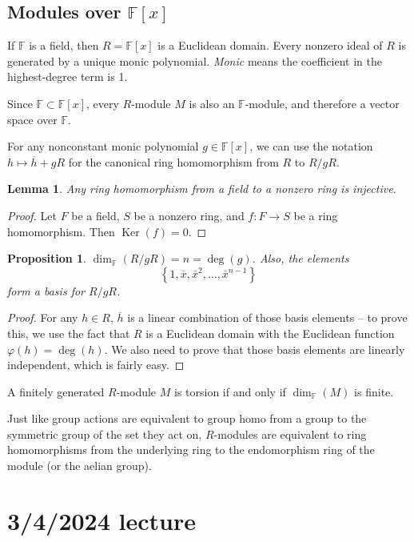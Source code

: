 \documentclass[12pt]{article}
\newtheorem{lem}[thm]{Lemma}
\newtheorem{prop}[thm]{Proposition}
\begin{document}
\subsection{Modules over $\mathbb{F}[x]$}
If $\mathbb{F}$ is a field, then $R=\mathbb{F}[x]$ is a Euclidean domain. Every nonzero ideal of $R$ is generated by a unique monic polynomial. \textit{Monic} means the coefficient in the highest-degree term is 1.
\par
Since $\mathbb{F} \subset \mathbb{F}[x]$, every $R$-module $M$ is also an $\mathbb{F}$-module, and therefore a vector space over $\mathbb{F}$.
\par
For any nonconstant monic polynomial $g \in \mathbb{F}[x]$, we can use the notation $h \mapsto \overline{h}+gR$ for the canonical ring homomorphism from $R$ to $R/gR$.
\begin{lem}\label{fieldhomoinjective}
    Any ring homomorphism from a field to a nonzero ring is injective.
\end{lem}
\begin{proof}
    Let $F$ be a field, $S$ be a nonzero ring, and $f : F \rightarrow S$ be a ring homomorphism. Then $ \operatorname{Ker}(f)=0$.
\end{proof}
\begin{prop}\label{vgbhjinokxcfvgbuni}
    $ \operatorname{dim}_\mathbb{F}(R/gR) = n = \operatorname{deg}(g)$. Also, the elements
    \[ \left\{ 1, \overline{x}, \overline{x}^2, \dots, \overline{x}^{n-1} \right\} \]
    form a basis for $R/gR$.
\end{prop}
\begin{proof}
    For any $h \in R$, $\overline{h}$ is a linear combination of those basis elements -- to prove this, we use the fact that $R$ is a Euclidean domain with the Euclidean function $\varphi(h)= \operatorname{deg}(h)$. We also need to prove that those basis elements are linearly independent, which is fairly easy.
\end{proof}
A finitely generated $R$-module $M$ is torsion if and only if $ \operatorname{dim}_\mathbb{F}(M)$ is finite.
\par
Just like group actions are equivalent to group homo from a group to the symmetric group of the set they act on, $R$-modules are equivalent to ring homomorphisms from the underlying ring to the endomorphism ring of the module (or the aelian group).

\section{3/4/2024 lecture}
\end{document}

